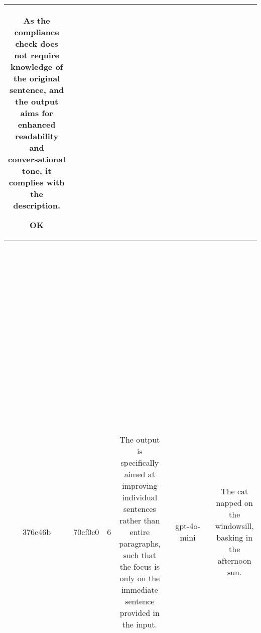 \begin{table}[h!]
\begin{tabular}{|c|c|c|c|c|c|c|c|c|c|}
As the compliance check does not require knowledge of the original sentence, and the output aims for enhanced readability and conversational tone, it complies with the description.

OK & \\
\hline
376c46b & 70cf0c0 & 6 & The output is specifically aimed at improving individual sentences rather than entire paragraphs, such that the focus is only on the immediate sentence provided in the input. & gpt-4o-mini & The cat napped on the windowsill, basking in the afternoon sun. & The cat curled up on the windowsill, soaking in the warm afternoon sunlight. & ok & The evaluation is focused on whether the chatbot output is readable, conversational, and engaging while preserving the original meaning. In this case, the sentence is straightforward, and the language used is simple and easy to relate to. The output describes an action taken by a cat (curling up on the windowsill) and its effect (soaking in the warm afternoon sunlight) using common, relatable language. The structure is fluid, with no unnecessarily complex phrases. It does not contain any elements that make it difficult to understand or deviate from the purpose of enhancing readability and conversational style.

No violation.
OK & \\
\hline
376c46b & 70cf0c0 & 6 & The output is specifically aimed at improving individual sentences rather than entire paragraphs, such that the focus is only on the immediate sentence provided in the input. & qwen2.5:3b & The cat napped on the windowsill, basking in the afternoon sun. & Sure! Here’s a more conversational version of that sentence:

"The cat took a nap on the windowsill, enjoying the warm rays of the afternoon sun." & ok & The chatbot output provides a sentence that is simple, easy to understand, and uses language that is relatable. However, without the original sentence (input), it is not possible to definitively conclude whether the output maintains the original meaning and factual accuracy or whether the sentence has been rewritten to enhance readability. Furthermore, the chatbot output does not generate a sentence that has complex phrases that have been simplified since the complexity of the original input sentence is unknown. Thus, the evaluation of simplification, preservation of the original meaning, and factual accuracy cannot be assessed. Despite this limitation, the output does seem conversational and fluid based on structural dynamics alone.


\end{tabular}
\end{table}
